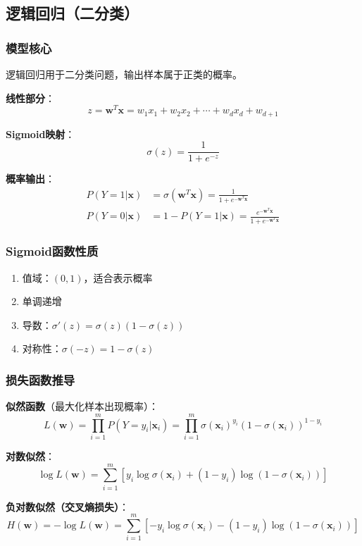 \documentclass[12pt,a4paper]{ctexart}
\begin{document}
\subsection{逻辑回归（二分类）}

\subsubsection{模型核心}

逻辑回归用于二分类问题，输出样本属于正类的概率。

\textbf{线性部分}：
\[
z = \mathbf{w}^T\mathbf{x} = w_1x_1 + w_2x_2 + \cdots + w_dx_d + w_{d+1}
\]

\textbf{Sigmoid映射}：
\[
\sigma(z) = \frac{1}{1 + e^{-z}}
\]

\textbf{概率输出}：
\begin{align}
P(Y=1|\mathbf{x}) &= \sigma(\mathbf{w}^T\mathbf{x}) = \frac{1}{1 + e^{-\mathbf{w}^T\mathbf{x}}} \\
P(Y=0|\mathbf{x}) &= 1 - P(Y=1|\mathbf{x}) = \frac{e^{-\mathbf{w}^T\mathbf{x}}}{1 + e^{-\mathbf{w}^T\mathbf{x}}}
\end{align}

\subsubsection{Sigmoid函数性质}

\begin{enumerate}
    \item 值域：$(0, 1)$，适合表示概率
    \item 单调递增
    \item 导数：$\sigma'(z) = \sigma(z)(1 - \sigma(z))$
    \item 对称性：$\sigma(-z) = 1 - \sigma(z)$
\end{enumerate}

\subsubsection{损失函数推导}

\textbf{似然函数}（最大化样本出现概率）：
\[
L(\mathbf{w}) = \prod_{i=1}^{m} P(Y=y_i|\mathbf{x}_i) = \prod_{i=1}^{m} \sigma(\mathbf{x}_i)^{y_i}(1-\sigma(\mathbf{x}_i))^{1-y_i}
\]

\textbf{对数似然}：
\[
\log L(\mathbf{w}) = \sum_{i=1}^{m}\left[y_i\log\sigma(\mathbf{x}_i) + (1-y_i)\log(1-\sigma(\mathbf{x}_i))\right]
\]

\textbf{负对数似然（交叉熵损失）}：
\[
H(\mathbf{w}) = -\log L(\mathbf{w}) = \sum_{i=1}^{m}\left[-y_i\log\sigma(\mathbf{x}_i) - (1-y_i)\log(1-\sigma(\mathbf{x}_i))\right]
\]
\end{document}
